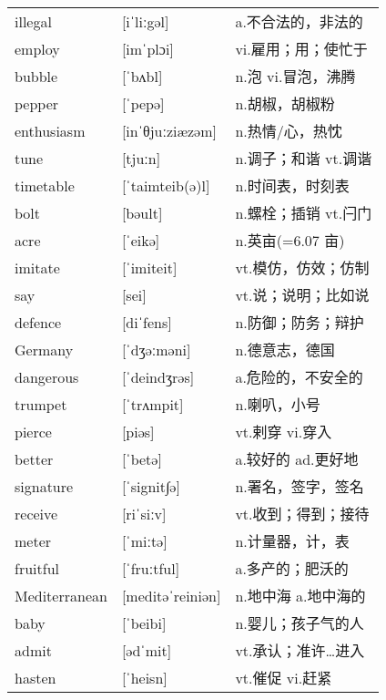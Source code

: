 \documentclass[a4paper]{article}
\begin{document}
\section{}
\begin{tabular}{l l l}

illegal & [iˈliːgəl] & a.不合法的，非法的 \\
employ & [imˈplɔi] & vi.雇用；用；使忙于 \\
bubble & [ˈbʌbl] & n.泡 vi.冒泡，沸腾 \\
pepper & [ˈpepə] & n.胡椒，胡椒粉 \\
enthusiasm & [inˈθjuːziæzəm] & n.热情/心，热忱 \\
tune & [tjuːn] & n.调子；和谐 vt.调谐 \\
timetable & [ˈtaimteib(ə)l] & n.时间表，时刻表 \\
bolt & [bəult] & n.螺栓；插销 vt.闩门 \\
acre & [ˈeikə] & n.英亩(=6.07 亩) \\
imitate & [ˈimiteit] & vt.模仿，仿效；仿制 \\
say & [sei] & vt.说；说明；比如说 \\
defence & [diˈfens] & n.防御；防务；辩护 \\
Germany & [ˈdʒəːməni] & n.德意志，德国 \\
dangerous & [ˈdeindʒrəs] & a.危险的，不安全的 \\
trumpet & [ˈtrʌmpit] & n.喇叭，小号 \\
pierce & [piəs] & vt.剌穿 vi.穿入 \\
better & [ˈbetə] & a.较好的 ad.更好地 \\
signature & [ˈsignit∫ə] & n.署名，签字，签名 \\
receive & [riˈsiːv] & vt.收到；得到；接待 \\
meter & [ˈmiːtə] & n.计量器，计，表 \\
fruitful & [ˈfruːtful] & a.多产的；肥沃的 \\
Mediterranean & [meditəˈreiniən] & n.地中海 a.地中海的 \\
baby & [ˈbeibi] & n.婴儿；孩子气的人 \\
admit & [ədˈmit] & vt.承认；准许…进入 \\
hasten & [ˈheisn] & vt.催促 vi.赶紧 \\

\end{tabular}
\end{document}
